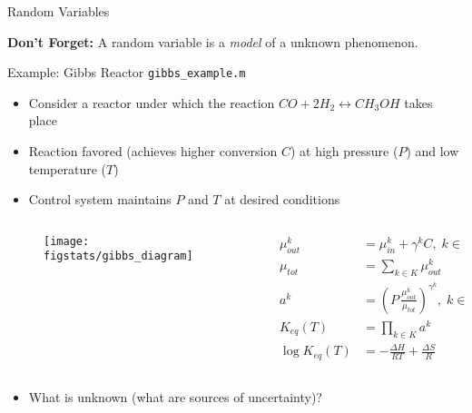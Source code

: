 \documentclass[handout,9pt]{beamer}
\begin{document}
\begin{frame}{Random Variables}
\begin{block}{}
{\bf Don't Forget:} A random variable is a {\em model} of a unknown phenomenon. 
\end{block}
\end{frame}

\begin{frame}{Example: Gibbs Reactor \footnotesize{\texttt{gibbs\_example.m}}}

\begin{itemize}
 \setlength{\itemsep}{5pt}
\item Consider a reactor under which the reaction $CO+2H_2\leftrightarrow CH_3OH$ takes place
\item Reaction favored (achieves higher conversion $C$) at high pressure ($P$) and low temperature ($T$)
\item Control system maintains $P$ and $T$ at desired conditions
\end{itemize}

\begin{columns}
\begin{column}{0.3\textwidth}
\begin{figure}[!htb]
    \centering
	\texttt{[image: figstats/gibbs\_diagram]}
\end{figure}
\end{column}
\begin{column}{0.5\textwidth}
\begin{align*}
\mu_{out}^k&=\mu_{in}^k+\gamma^kC,\;k\in K\\
\mu_{tot}&=\sum_{k\in K}\mu_{out}^k\\
a^k&=\left(P\,\frac{\mu_{out}^k}{\mu_{tot}}\right)^{\gamma^k},\;k\in K\\
K_{eq}(T)&=\prod_{k\in K}a^k\\
\log K_{eq}(T)&=-\frac{\Delta H}{RT}+\frac{\Delta S}{R}
\end{align*}
\end{column}

\end{columns}


\begin{block}{}
\begin{itemize}
\item What is unknown (what are sources of uncertainty)?
\end{itemize}
\end{block}
\end{frame}
\end{document}
